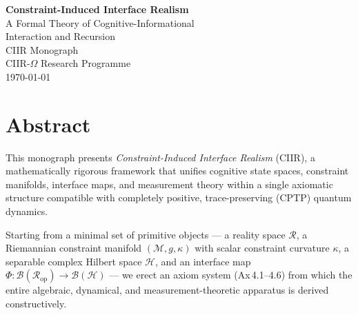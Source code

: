 \documentclass[11pt,a4paper,openany]{book}
\theoremstyle{remark}
\newcommand{\CR}{\mathcal{R}}          %
\newcommand{\CM}{\mathcal{M}}          %
\newcommand{\CB}{\mathcal{B}}          %
\begin{document}
\frontmatter

\begin{titlepage}
\centering
\vspace*{2cm}
{\Huge\bfseries Constraint-Induced Interface Realism}\\[0.8cm]
{\LARGE A Formal Theory of Cognitive-Informational\\[0.3cm]
Interaction and Recursion}\\[2cm]
{\Large CIIR Monograph}\\[1cm]
{\large CIIR-$\Omega$ Research Programme}\\[3cm]
{\large\today}
\vfill
\end{titlepage}

\chapter*{Abstract}

This monograph presents \emph{Constraint-Induced Interface Realism}
(CIIR), a mathematically rigorous framework that unifies cognitive state
spaces, constraint manifolds, interface maps, and measurement theory
within a single axiomatic structure compatible with completely positive,
trace-preserving (CPTP) quantum dynamics.

Starting from a minimal set of primitive objects — a reality space
$\CR$, a Riemannian constraint manifold $(\CM, g, \kappa)$ with scalar
constraint curvature $\kappa$, a separable complex Hilbert space
$\mathcal{H}$, and an interface map $\Phi : \CB(\CR_{\mathrm{op}})
\to \CB(\mathcal{H})$ — we erect an axiom system (Ax\,4.1--4.6) from
which the entire algebraic, dynamical, and measurement-theoretic
apparatus is derived constructively.
\end{document}
